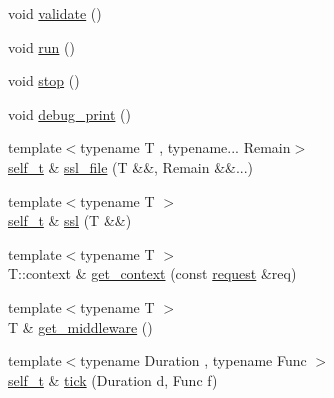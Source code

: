 \begin{DoxyCompactItemize}
void \hyperlink{classcrow_1_1_crow_ab9a22c981e0afec0d55ee234683a6d38}{validate} ()
\item 
void \hyperlink{classcrow_1_1_crow_a193d8b03f717234a841cd92f72c6b4b5}{run} ()
\item 
void \hyperlink{classcrow_1_1_crow_a0266672657128919ab9a067d93f3868f}{stop} ()
\item 
void \hyperlink{classcrow_1_1_crow_a839c1e6f82d577308eb6f0d4948a4fbb}{debug\-\_\-print} ()
\item 
{\footnotesize template$<$typename T , typename... Remain$>$ }\\\hyperlink{classcrow_1_1_crow_a5b0a203a6f9070ea8010227dcdbcec60}{self\-\_\-t} \& \hyperlink{classcrow_1_1_crow_af9ba728b92666e91d1852b125cf12803}{ssl\-\_\-file} (T \&\&, Remain \&\&...)
\item 
{\footnotesize template$<$typename T $>$ }\\\hyperlink{classcrow_1_1_crow_a5b0a203a6f9070ea8010227dcdbcec60}{self\-\_\-t} \& \hyperlink{classcrow_1_1_crow_a9052f48a13c6a73b1ff516f0fc0bf2e8}{ssl} (T \&\&)
\item 
{\footnotesize template$<$typename T $>$ }\\T\-::context \& \hyperlink{classcrow_1_1_crow_ab9f401a95ab8fdc6ec65d542899954cc}{get\-\_\-context} (const \hyperlink{structcrow_1_1request}{request} \&req)
\item 
{\footnotesize template$<$typename T $>$ }\\T \& \hyperlink{classcrow_1_1_crow_a416e872b703c27154845aca516d0a417}{get\-\_\-middleware} ()
\item 
{\footnotesize template$<$typename Duration , typename Func $>$ }\\\hyperlink{classcrow_1_1_crow_a5b0a203a6f9070ea8010227dcdbcec60}{self\-\_\-t} \& \hyperlink{classcrow_1_1_crow_a068042431b0be5911ee1689a285f4693}{tick} (Duration d, Func f)
\end{DoxyCompactItemize}


